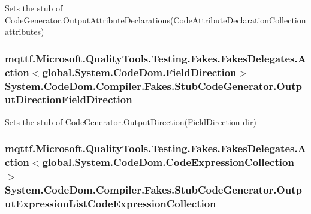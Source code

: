 Sets the stub of Code\-Generator.\-Output\-Attribute\-Declarations(\-Code\-Attribute\-Declaration\-Collection attributes)

\hypertarget{class_system_1_1_code_dom_1_1_compiler_1_1_fakes_1_1_stub_code_generator_a2e4d4e380c340132b79d51098ffdd51a}{
\subsubsection[{Output\-Direction\-Field\-Direction}]{\setlength{\rightskip}{0pt plus 5cm}mqttf.\-Microsoft.\-Quality\-Tools.\-Testing.\-Fakes.\-Fakes\-Delegates.\-Action$<$global.\-System.\-Code\-Dom.\-Field\-Direction$>$ System.\-Code\-Dom.\-Compiler.\-Fakes.\-Stub\-Code\-Generator.\-Output\-Direction\-Field\-Direction}}\label{class_system_1_1_code_dom_1_1_compiler_1_1_fakes_1_1_stub_code_generator_a2e4d4e380c340132b79d51098ffdd51a}


Sets the stub of Code\-Generator.\-Output\-Direction(\-Field\-Direction dir)

\hypertarget{class_system_1_1_code_dom_1_1_compiler_1_1_fakes_1_1_stub_code_generator_a637566276486473b181da28835155355}{
\subsubsection[{Output\-Expression\-List\-Code\-Expression\-Collection}]{\setlength{\rightskip}{0pt plus 5cm}mqttf.\-Microsoft.\-Quality\-Tools.\-Testing.\-Fakes.\-Fakes\-Delegates.\-Action$<$global.\-System.\-Code\-Dom.\-Code\-Expression\-Collection$>$ System.\-Code\-Dom.\-Compiler.\-Fakes.\-Stub\-Code\-Generator.\-Output\-Expression\-List\-Code\-Expression\-Collection}}\label{class_system_1_1_code_dom_1_1_compiler_1_1_fakes_1_1_stub_code_generator_a637566276486473b181da28835155355}


